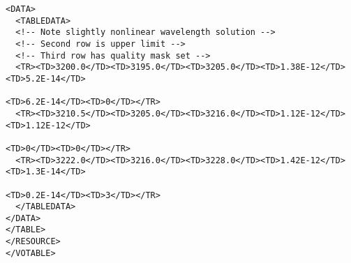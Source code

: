 {\begin{flushleft}
\begin{fmpage}
\begin{verbatim}
<DATA>
  <TABLEDATA>
  <!-- Note slightly nonlinear wavelength solution -->
  <!-- Second row is upper limit -->
  <!-- Third row has quality mask set -->
  <TR><TD>3200.0</TD><TD>3195.0</TD><TD>3205.0</TD><TD>1.38E-12</TD><TD>5.2E-14</TD>
                                                                        <TD>6.2E-14</TD><TD>0</TD></TR>
  <TR><TD>3210.5</TD><TD>3205.0</TD><TD>3216.0</TD><TD>1.12E-12</TD><TD>1.12E-12</TD>
                                                                              <TD>0</TD><TD>0</TD></TR>
  <TR><TD>3222.0</TD><TD>3216.0</TD><TD>3228.0</TD><TD>1.42E-12</TD><TD>1.3E-14</TD>
                                                                        <TD>0.2E-14</TD><TD>3</TD></TR>
  </TABLEDATA>
</DATA>
</TABLE>
</RESOURCE>
</VOTABLE>

\end{verbatim}
\end{fmpage}
\end{flushleft}
}
